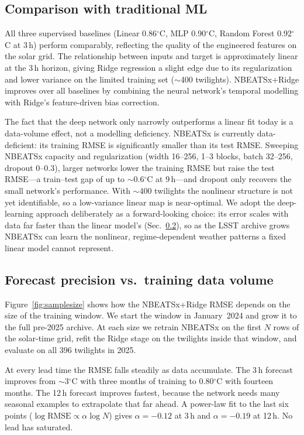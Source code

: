 \documentclass[]{spie}  %
\newcommand{\degC}{$^{\circ}$C}
\begin{document}
\subsection{Comparison with traditional ML}

All three supervised baselines (Linear 0.86\degC{}, MLP 0.90\degC{}, Random Forest 0.92\degC{} at 3\,h) perform comparably, reflecting the quality of the engineered features on the solar grid. The relationship between inputs and target is approximately linear at the 3\,h horizon, giving Ridge regression a slight edge due to its regularization and lower variance on the limited training set ($\sim$400 twilights). NBEATSx+Ridge improves over all baselines by combining the neural network's temporal modelling with Ridge's feature-driven bias correction.

The fact that the deep network only narrowly outperforms a linear fit today is a data-volume effect, not a modelling deficiency. NBEATSx is currently data-deficient: its training RMSE is significantly smaller than its test RMSE. Sweeping NBEATSx capacity and regularization (width 16--256, 1--3 blocks, batch 32--256, dropout 0--0.3), larger networks lower the training RMSE but raise the test RMSE---a train--test gap of up to $\sim$0.6\degC{} at 9\,h---and dropout only recovers the small network's performance. With $\sim$400 twilights the nonlinear structure is not yet identifiable, so a low-variance linear map is near-optimal. We adopt the deep-learning approach deliberately as a forward-looking choice: its error scales with data far faster than the linear model's (Sec.~\ref{sec:discussion:samplesize}), so as the LSST archive grows NBEATSx can learn the nonlinear, regime-dependent weather patterns a fixed linear model cannot represent.

\subsection{Forecast precision vs.\ training data volume}
\label{sec:discussion:samplesize}

Figure~\ref{fig:samplesize} shows how the NBEATSx+Ridge RMSE depends on the size of the training window. We start the window in January~2024 and grow it to the full pre-2025 archive. At each size we retrain NBEATSx on the first $N$ rows of the solar-time grid, refit the Ridge stage on the twilights inside that window, and evaluate on all 396 twilights in 2025.

At every lead time the RMSE falls steadily as data accumulate. The 3\,h forecast improves from $\sim$3\degC{} with three months of training to 0.80\degC{} with fourteen months. The 12\,h forecast improves fastest, because the network needs many seasonal examples to extrapolate that far ahead. A power-law fit to the last six points ($\log\text{RMSE} \propto \alpha \log N$) gives $\alpha = -0.12$ at 3\,h and $\alpha = -0.19$ at 12\,h. No lead has saturated.
\end{document}
